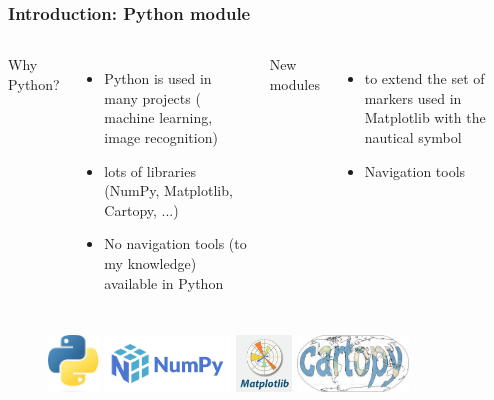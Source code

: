 \documentclass{beamer}
\begin{document}
\begin{frame}
\frametitle{Introduction: Python module}
    
        \begin{columns}
        Why Python?
        \begin{itemize}
            \item Python is used in many projects ( machine learning, image recognition)
            \item lots of libraries (NumPy, Matplotlib, Cartopy, ...)
            \item No navigation tools (to my knowledge) available in Python
        \end{itemize}
    
        New modules
        \begin{itemize}
            \item to extend the set of markers used in Matplotlib with the nautical symbol
            \item Navigation tools
        \end{itemize}
    \end{columns}

        \begin{figure}[h]
        \centering
        \includegraphics[height=1.5cm]{./pictures/python.jpeg}
        \includegraphics[height=1.5cm]{./pictures/numpy.png}
        \includegraphics[height=1.5cm]{./pictures/matplotlib.png}
        \includegraphics[height=1.5cm]{./pictures/cartopy.jpeg}
        \end{figure}


\end{frame}
\end{document}
